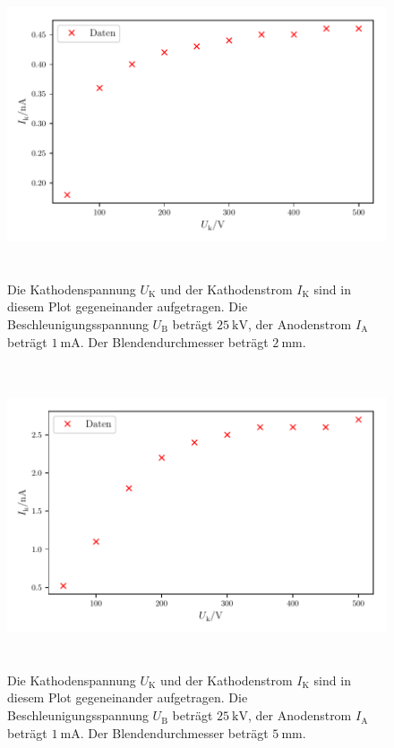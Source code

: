 \begin{figure}
    \centering
    \includegraphics[width=15cm, height=9cm]{build/plota.pdf}
    \caption{Die Kathodenspannung $U_\text{K}$ und der Kathodenstrom $I_\text{K}$ sind in diesem Plot gegeneinander aufgetragen. Die Beschleunigungsspannung $U_\text{B}$ beträgt $\SI{25}{\kilo\volt}$, der Anodenstrom $I_\text{A}$ beträgt $\SI{1}{\milli\ampere}$. Der Blendendurchmesser beträgt $\SI{2}{\milli\meter}$.}
    \label{plota}
\end{figure}

\begin{figure}
    \centering
    \includegraphics[width=15cm, height=9cm]{build/plotb.pdf}
    \caption{Die Kathodenspannung $U_\text{K}$ und der Kathodenstrom $I_\text{K}$ sind in diesem Plot gegeneinander aufgetragen. Die Beschleunigungsspannung $U_\text{B}$ beträgt $\SI{25}{\kilo\volt}$, der Anodenstrom $I_\text{A}$ beträgt $\SI{1}{\milli\ampere}$. Der Blendendurchmesser beträgt $\SI{5}{\milli\meter}$.}
    \label{plotb}
\end{figure}

